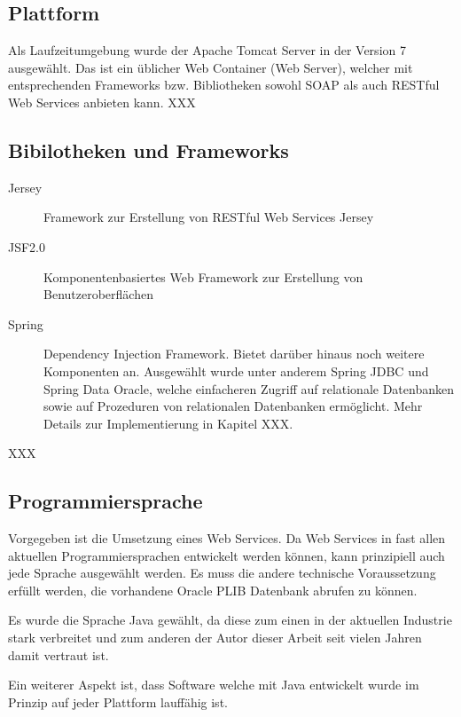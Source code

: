\subsection{Plattform} 
Als Laufzeitumgebung wurde der Apache Tomcat Server in der Version 7 ausgewählt. Das ist ein üblicher Web Container (Web Server), welcher mit entsprechenden Frameworks bzw. Bibliotheken sowohl \gls{SOAP} als auch RESTful Web Services anbieten kann. 
XXX

\subsection{Bibilotheken und Frameworks} \label{bibliotheken_und_frameworks}
\begin{description}

\item[Jersey] Framework zur Erstellung von RESTful Web Services \gls{Jersey}
\item[JSF2.0] Komponentenbasiertes Web Framework zur Erstellung von Benutzeroberflächen 
\item[Spring] Dependency Injection Framework. Bietet darüber hinaus noch weitere Komponenten an. Ausgewählt wurde unter anderem \gls{Spring} JDBC und \gls{Spring} Data Oracle, welche einfacheren Zugriff auf relationale Datenbanken sowie auf Prozeduren von relationalen Datenbanken ermöglicht. Mehr Details zur Implementierung in Kapitel XXX.  
    
\end{description}

XXX

\subsection{Programmiersprache}
Vorgegeben ist die Umsetzung eines Web Services. Da Web Services in fast allen aktuellen Programmiersprachen entwickelt werden können, kann prinzipiell auch jede Sprache ausgewählt werden. 
Es muss die andere technische Voraussetzung erfüllt werden, die vorhandene Oracle PLIB Datenbank abrufen zu können. 

Es wurde die Sprache Java gewählt, da diese zum einen in der aktuellen Industrie stark verbreitet  und zum anderen der Autor dieser Arbeit seit vielen Jahren damit vertraut ist. 

Ein weiterer Aspekt ist, dass Software welche mit Java entwickelt wurde im Prinzip auf jeder Plattform lauffähig ist. 

